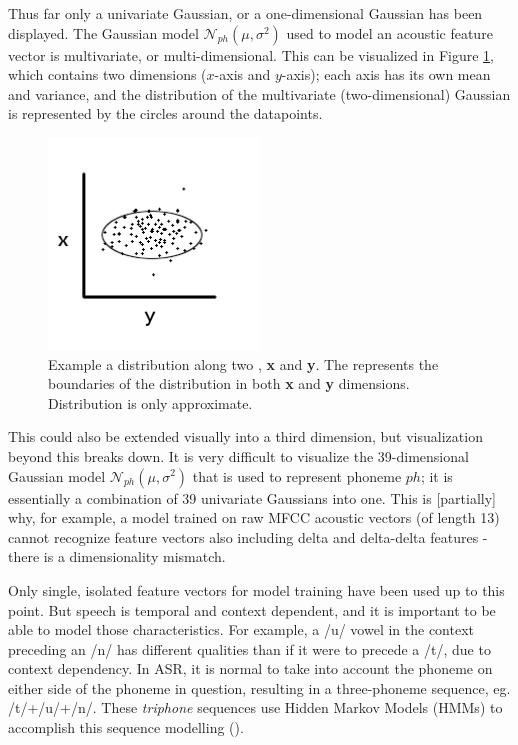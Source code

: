 Thus far only a univariate Gaussian, or a one-dimensional Gaussian has been displayed.  The Gaussian model $\mathcal{N}_{ph}(\mu,\sigma^2)$ used to model an acoustic feature vector is multivariate, or multi-dimensional.  This can be visualized in Figure \ref{fig:two-dim-gauss}, which contains two dimensions ($x$-axis and $y$-axis); each axis has its own mean and variance, and the distribution of the multivariate (two-dimensional) Gaussian is represented by the circles around the datapoints.  
\begin{figure}
\includegraphics[width=0.5\textwidth]{figure/two-dim-gauss.png}
\caption{Example a distribution along two \DIFdelbegin {}\DIFdelend \DIFaddbegin {}\DIFaddend , \textbf{x} and \textbf{y}.  The \DIFdelbegin {}\DIFdelend \DIFaddbegin {}\DIFaddend represents the boundaries of the distribution in both \textbf{x} and \textbf{y} dimensions. Distribution is only approximate.}\label{fig:two-dim-gauss}
\end{figure}
This could also be extended visually into a third dimension, but visualization beyond this breaks down.  It is very difficult to visualize the 39-dimensional Gaussian model $\mathcal{N}_{ph}(\mu,\sigma^2)$ that is used to represent phoneme $ph$; it is essentially a combination of 39 univariate Gaussians into one.
This is [partially] why, for example, a model trained on raw MFCC acoustic vectors (of length 13) cannot recognize feature vectors also including delta and delta-delta features - there is a dimensionality mismatch.


Only single, isolated feature vectors for model training have been used up to this point.  But speech is temporal and context dependent, and it is important to be able to model those characteristics.  For example, a /u/ vowel in the context preceding an /n/ has different qualities than if it were to precede a /t/, due to context dependency.  In ASR, it is normal to take into account the phoneme on either side of the phoneme in question, resulting in a three-phoneme sequence, eg. /t/+/u/+/n/.  These \textit{triphone} sequences use Hidden Markov Models (HMMs) to accomplish this sequence modelling (\cite{jurafsky:09}).

